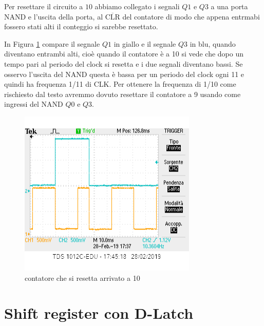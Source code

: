 \documentclass[10pt,a4paper]{article}
\begin{document}
Per resettare il circuito a $10$  abbiamo collegato i segnali $Q1$ e $Q3$ a una porta NAND e l'uscita della porta,  al $\overline{\mathrm{CLR}}$ del contatore di modo che appena entrmabi fossero stati alti il conteggio si sarebbe resettato. 

In Figura \ref{fig:dec} compare il segnale $Q1$ in giallo  e il segnale $Q3$ in blu, quando diventano entrambi alti, cioè quando il contatore è a 10 si vede che dopo un tempo pari al periodo del clock si resetta e  i due segnali diventano bassi. Se osservo l'uscita del NAND questa è bassa per un periodo del clock ogni 11 e quindi ha frequenza 1/11 di CLK. Per ottenere la frequenza di 1/10 come rischiesto dal testo avremmo dovuto resettare il contatore a 9 usando come ingressi del NAND $Q0$ e $Q3$.
\begin{figure}[h]
	\centering
	\includegraphics[scale=0.85]{decadico.png}
	\caption{contatore che si resetta arrivato a 10}            
	\label{fig:dec}                    
\end{figure}

\section{Shift register con D-Latch}
\end{document}
